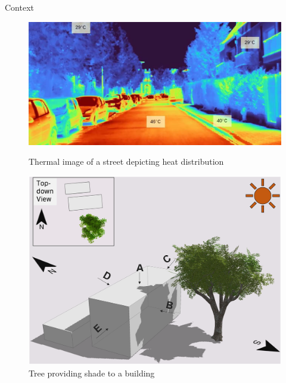 \documentclass[10pt]{beamer}
\begin{document}
\begin{frame}{Context}
\begin{figure}[h]
    \centering
    \begin{minipage}{0.49\textwidth}
        \centering
        \includegraphics[width=\textwidth]{images/heat-street.png}
        \caption{Thermal image of a street depicting heat distribution}
        \label{fig:figure1}
    \end{minipage}\hfill
    \begin{minipage}{0.49\textwidth}
        \centering
        \includegraphics[width=\textwidth]{images/tree-shade.png}
        \caption{Tree providing shade to a building}
        \label{fig:figure2}
    \end{minipage}
\end{figure}
\end{frame}
\end{document}
